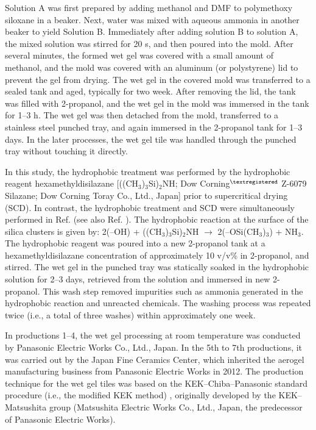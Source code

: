 \documentclass[5p,twocolumn]{elsarticle}
\begin{document}
Solution A was first prepared by adding methanol and DMF to polymethoxy siloxane in a beaker. Next, water was mixed with aqueous ammonia in another beaker to yield Solution B. Immediately after adding solution B to solution A, the mixed solution was stirred for 20 s, and then poured into the mold. After several minutes, the formed wet gel was covered with a small amount of methanol, and the mold was covered with an aluminum (or polystyrene) lid to prevent the gel from drying. The wet gel in the covered mold was transferred to a sealed tank and aged, typically for two week. After removing the lid, the tank was filled with 2-propanol, and the wet gel in the mold was immersed in the tank for 1--3 h. The wet gel was then detached from the mold, transferred to a stainless steel punched tray, and again immersed in the 2-propanol tank for 1--3 days. In the later processes, the wet gel tile was handled through the punched tray without touching it directly.

In this study, the hydrophobic treatment was performed by the hydrophobic reagent hexamethyldisilazane [((CH$_3$)$_3$Si)$_2$NH; Dow Corning$^{\textregistered }$ Z-6079 Silazane; Dow Corning Toray Co., Ltd., Japan] prior to supercritical drying (SCD). In contrast, the hydrophobic treatment and SCD were simultaneously performed in Ref. \cite{cite18} (see also Ref. \cite{cite5}). The hydrophobic reaction at the surface of the silica clusters is given by: 2(--OH) + ((CH$_3$)$_3$Si)$_2$NH $\to $ 2(--OSi(CH$_3$)$_3$) + NH$_3$. The hydrophobic reagent was poured into a new 2-propanol tank at a hexamethyldisilazane concentration of approximately 10 v/v\% in 2-propanol, and stirred. The wet gel in the punched tray was statically soaked in the hydrophobic solution for 2--3 days, retrieved from the solution and immersed in new 2-propanol. This wash step removed impurities such as ammonia generated in the hydrophobic reaction and unreacted chemicals. The washing process was repeated twice (i.e., a total of three washes) within approximately one week.

In productions 1--4, the wet gel processing at room temperature was conducted by Panasonic Electric Works Co., Ltd., Japan. In the 5th to 7th productions, it was carried out by the Japan Fine Ceramics Center, which inherited the aerogel manufacturing business from Panasonic Electric Works in 2012. The production technique for the wet gel tiles was based on the KEK--Chiba--Panasonic standard procedure (i.e., the modified KEK method) \cite{cite2}, originally developed by the KEK--Matsushita group \cite{cite8} (Matsushita Electric Works Co., Ltd., Japan, the predecessor of Panasonic Electric Works).
\end{document}
